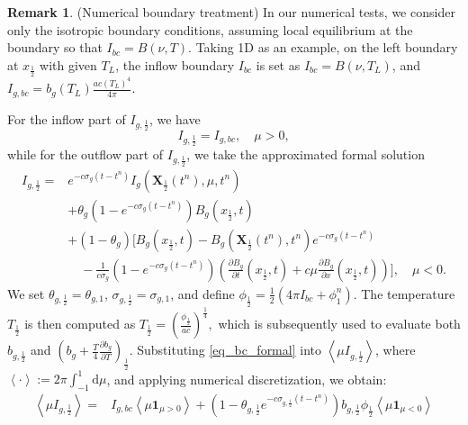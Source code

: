 \documentclass[preprint,12pt]{elsarticle}
\theoremstyle{definition}
\newtheorem{remark}{Remark}[section]
\theoremstyle{plain}
\numberwithin{equation}{section}
\numberwithin{algorithm}{section}
\newcounter{eq_count}
\newcommand{\half}{\frac{1}{2}}
\newcommand{\mfx}{{\mathbf{X}}}
\newcommand{\dd}{{\text{d}}}
\newcommand{\pdrv}[2]{\frac{\partial{#1}}{\partial{#2}}}
\begin{document}
\begin{remark}
    (Numerical boundary treatment)  
     In our numerical tests, we consider only the isotropic  boundary conditions, assuming local equilibrium at the boundary so that $I_{bc} = B(\nu,T)$. Taking 1D as an example, on the left boundary at $x_{\half}$ with given $T_L$, the inflow boundary $I_{bc}$ is set as $I_{bc} = B(\nu,T_{L})$, and $I_{g,bc} = b_g(T_{L})\frac{ac(T_{L})^4}{4\pi}$. 

     For the inflow part of $I_{g,\frac{1}{2}}$, we have
    \begin{equation}
        I_{g,\frac{1}{2}} = I_{g,bc}, \quad \mu >0,
    \end{equation}
    while for the outflow part of $I_{g,\frac{1}{2}}$, we take the approximated formal solution
\begin{equation} \label{eq_bc_formal}
		\begin{aligned}
		  I_{g,\frac{1}{2}}
            = & e^{-c \sigma_{g}(t-t^n)} I_{g}\left( \mfx_{\half}(t^n), \mu,t^n\right) 
            \\ 
		  & +  \theta_{g}     ( 1 - e^{-c \sigma_{g}(t-t^n)}) B_g \left( x_{\half},  t\right) 
            \\
            & + ( 1 - \theta_{g}  ) \Bigg[ B_g  \left( x_{\half},  t\right)-B_g \left( \mfx_{\half}(t^n),  t^n\right) e^{-c \sigma_{g}(t-t^n)} \\ 
			& \quad  -  \frac{1}{c \sigma_{g}} (1 - e^{-c \sigma_{g}(t-t^n)}) \left( \pdrv{B_g }{t}(x_{\half},t) +  c \mu  \pdrv{B_g}{x}  (x_{\half},t)  \right)   \Bigg], \quad \mu <0.
		\end{aligned}
    \end{equation}
    We set $\theta_{g,\half} = \theta_{g,1}$, $\sigma_{g,\half} = \sigma_{g,1}$, and define $\phi_{\half} = \frac{1}{2}(4 \pi I_{bc} + \phi_1^n)$. The temperature $T_{\half}$ is then computed as $T_{\half} = \left(\frac{\phi_{\half}}{ac}\right)^{\frac{1}{4}},$ which is subsequently used to evaluate both $b_{g,\half}$ and $\left(b_g + \frac{T}{4}\frac{\partial b_g}{\partial T}\right)_{\half}$. Substituting  \eqref{eq_bc_formal} into $\left\langle \mu I_{g,\frac{1}{2}} \right\rangle $, where $\left\langle \cdot \right\rangle := 2 \pi \int_{-1}^1 \dd{\mu}$, and applying numerical discretization, we obtain:
 	\begin{equation} \label{eq_bc}
		\begin{aligned}
			\left\langle \mu I_{g,\frac{1}{2}} \right\rangle = &
             I_{g,bc}\left\langle \mu \mathbf{1}_{\mu>0}\right\rangle + ( 1 - \theta_{g,\half} e^{-c \sigma_{g,\frac{1}{2}}(t-t^n)} )  b_{g,\half} \phi_{\half}  \left\langle \mu \mathbf{1}_{\mu<0}\right\rangle

\end{aligned}
\end{equation}
\end{remark}
\end{document}
